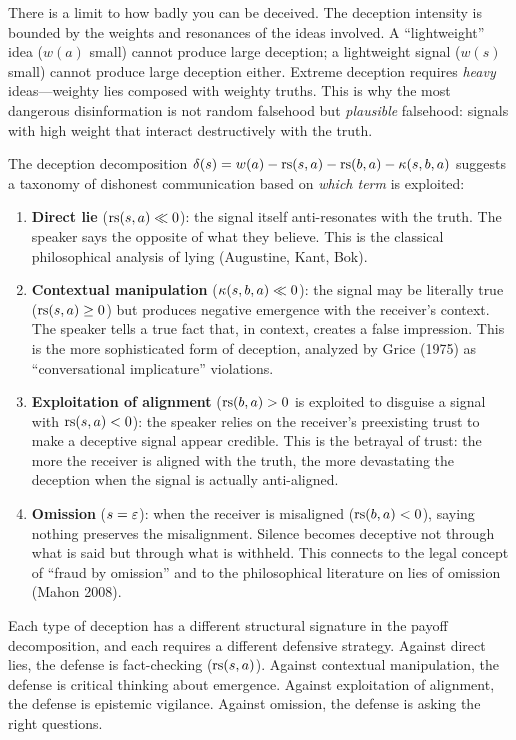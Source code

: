 \begin{interpretation}
There is a limit to how badly you can be deceived. The deception intensity is
bounded by the weights and resonances of the ideas involved. A ``lightweight''
idea ($w(a)$ small) cannot produce large deception; a lightweight signal
($w(s)$ small) cannot produce large deception either. Extreme deception
requires \emph{heavy} ideas---weighty lies composed with weighty truths.
This is why the most dangerous disinformation is not random falsehood but
\emph{plausible} falsehood: signals with high weight that interact
destructively with the truth.
\end{interpretation}

\begin{remark}
The deception decomposition $\delta(s) = w(a) - \mathrm{rs}(s, a) - \mathrm{rs}(b, a) -
\kappa(s, b, a)$ suggests a taxonomy of dishonest communication based on
\emph{which term} is exploited:

\begin{enumerate}
\item \textbf{Direct lie} ($\mathrm{rs}(s, a) \ll 0$): the signal itself
anti-resonates with the truth. The speaker says the opposite of what they
believe. This is the classical philosophical analysis of lying (Augustine,
Kant, Bok).

\item \textbf{Contextual manipulation} ($\kappa(s, b, a) \ll 0$): the
signal may be literally true ($\mathrm{rs}(s, a) \geq 0$) but produces negative
emergence with the receiver's context. The speaker tells a true fact that,
in context, creates a false impression. This is the more sophisticated form
of deception, analyzed by Grice (1975) as ``conversational implicature''
violations.

\item \textbf{Exploitation of alignment} ($\mathrm{rs}(b, a) > 0$ is exploited
to disguise a signal with $\mathrm{rs}(s, a) < 0$): the speaker relies on the
receiver's preexisting trust to make a deceptive signal appear credible.
This is the betrayal of trust: the more the receiver is aligned with the
truth, the more devastating the deception when the signal is actually
anti-aligned.

\item \textbf{Omission} ($s = \varepsilon$): when the receiver is misaligned
($\mathrm{rs}(b, a) < 0$), saying nothing preserves the misalignment. Silence
becomes deceptive not through what is said but through what is withheld.
This connects to the legal concept of ``fraud by omission'' and to
the philosophical literature on lies of omission (Mahon 2008).
\end{enumerate}

Each type of deception has a different structural signature in the payoff
decomposition, and each requires a different defensive strategy. Against
direct lies, the defense is fact-checking ($\mathrm{rs}(s, a)$). Against
contextual manipulation, the defense is critical thinking about emergence.
Against exploitation of alignment, the defense is epistemic vigilance.
Against omission, the defense is asking the right questions.
\end{remark}


